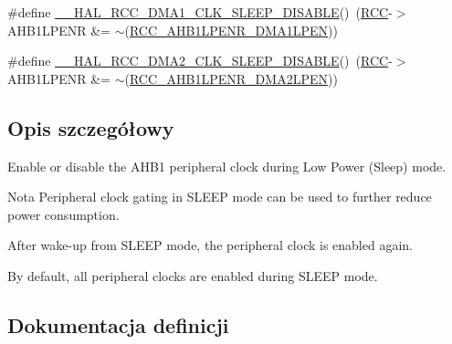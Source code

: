 \begin{DoxyCompactItemize}
\item 
\#define \hyperlink{group___r_c_c___a_h_b1___low_power___enable___disable_ga8786d21490439ef0564edff087203245}{\+\_\+\+\_\+\+H\+A\+L\+\_\+\+R\+C\+C\+\_\+\+D\+M\+A1\+\_\+\+C\+L\+K\+\_\+\+S\+L\+E\+E\+P\+\_\+\+D\+I\+S\+A\+B\+LE}()~(\hyperlink{group___peripheral__declaration_ga74944438a086975793d26ae48d5882d4}{R\+CC}-\/$>$A\+H\+B1\+L\+P\+E\+NR \&= $\sim$(\hyperlink{group___peripheral___registers___bits___definition_ga7d6c8ae1441d545d18c54b30c6a0da77}{R\+C\+C\+\_\+\+A\+H\+B1\+L\+P\+E\+N\+R\+\_\+\+D\+M\+A1\+L\+P\+EN}))
\item 
\#define \hyperlink{group___r_c_c___a_h_b1___low_power___enable___disable_ga6af5c50e1a578bcc17c9514c5ab976c9}{\+\_\+\+\_\+\+H\+A\+L\+\_\+\+R\+C\+C\+\_\+\+D\+M\+A2\+\_\+\+C\+L\+K\+\_\+\+S\+L\+E\+E\+P\+\_\+\+D\+I\+S\+A\+B\+LE}()~(\hyperlink{group___peripheral__declaration_ga74944438a086975793d26ae48d5882d4}{R\+CC}-\/$>$A\+H\+B1\+L\+P\+E\+NR \&= $\sim$(\hyperlink{group___peripheral___registers___bits___definition_ga9e2d376f6c7db4266a5b039a3aa6c207}{R\+C\+C\+\_\+\+A\+H\+B1\+L\+P\+E\+N\+R\+\_\+\+D\+M\+A2\+L\+P\+EN}))
\end{DoxyCompactItemize}


\subsection{Opis szczegółowy}
Enable or disable the A\+H\+B1 peripheral clock during Low Power (Sleep) mode. 

\begin{DoxyNote}{Nota}
Peripheral clock gating in S\+L\+E\+EP mode can be used to further reduce power consumption. 

After wake-\/up from S\+L\+E\+EP mode, the peripheral clock is enabled again. 

By default, all peripheral clocks are enabled during S\+L\+E\+EP mode. 
\end{DoxyNote}


\subsection{Dokumentacja definicji}
\mbox{\label{group___r_c_c___a_h_b1___low_power___enable___disable_ga8786d21490439ef0564edff087203245}} 
